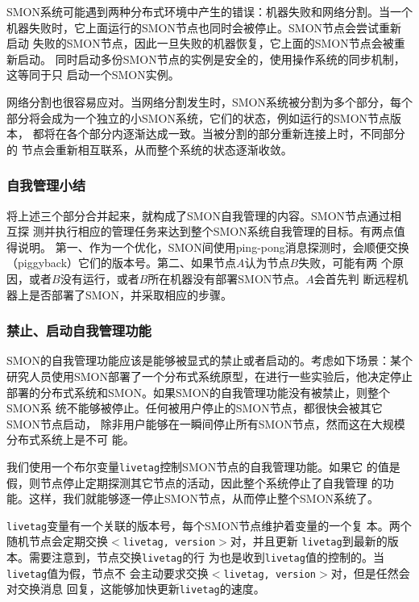 SMON系统可能遇到两种分布式环境中产生的错误：机器失败和网络分割。当一个
机器失败时，它上面运行的SMON节点也同时会被停止。SMON节点会尝试重新启动
失败的SMON节点，因此一旦失败的机器恢复，它上面的SMON节点会被重新启动。
同时启动多份SMON节点的实例是安全的，使用操作系统的同步机制，这等同于只
启动一个SMON实例。

网络分割也很容易应对。当网络分割发生时，SMON系统被分割为多个部分，每个
部分将会成为一个独立的小SMON系统，它们的状态，例如运行的SMON节点版本，
都将在各个部分内逐渐达成一致。当被分割的部分重新连接上时，不同部分的
节点会重新相互联系，从而整个系统的状态逐渐收敛。

\subsubsection*{自我管理小结}

将上述三个部分合并起来，就构成了SMON自我管理的内容。SMON节点通过相互探
测并执行相应的管理任务来达到整个SMON系统自我管理的目标。有两点值得说明。
第一、作为一个优化，SMON间使用ping-pong消息探测时，会顺便交换
（piggyback）它们的版本号。第二、如果节点$A$认为节点$B$失败，可能有两
个原因，或者$B$没有运行，或者$B$所在机器没有部署SMON节点。$A$会首先判
断远程机器上是否部署了SMON，并采取相应的步骤。

\subsubsection*{禁止、启动自我管理功能}

SMON的自我管理功能应该是能够被显式的禁止或者启动的。考虑如下场景：某个
研究人员使用SMON部署了一个分布式系统原型，在进行一些实验后，他决定停止
部署的分布式系统和SMON。如果SMON的自我管理功能没有被禁止，则整个SMON系
统不能够被停止。任何被用户停止的SMON节点，都很快会被其它SMON节点启动，
除非用户能够在一瞬间停止所有SMON节点，然而这在大规模分布式系统上是不可
能。

我们使用一个布尔变量\texttt{livetag}控制SMON节点的自我管理功能。如果它
的值是假，则节点停止定期探测其它节点的活动，因此整个系统停止了自我管理
的功能。这样，我们就能够逐一停止SMON节点，从而停止整个SMON系统了。

\texttt{livetag}变量有一个关联的版本号，每个SMON节点维护着变量的一个复
本。两个随机节点会定期交换\texttt{$<$livetag, version$>$}对，并且更新
\texttt{livetag}到最新的版本。需要注意到，节点交换\texttt{livetag}的行
为也是收到\texttt{livetag}值的控制的。当\texttt{livetag}值为假，节点不
会主动要求交换\texttt{$<$livetag, version$>$}对，但是任然会对交换消息
回复，这能够加快更新\texttt{livetag}的速度。

